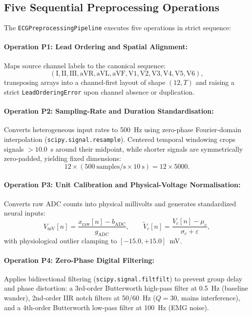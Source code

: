 \documentclass{ssnreview}
\begin{document}
\subsection{Five Sequential Preprocessing Operations}

The \texttt{ECGPreprocessingPipeline} executes five operations in strict sequence:

\paragraph{Operation P1: Lead Ordering and Spatial Alignment:} Maps source channel labels to the
canonical sequence:
\begin{equation}
  (\mathrm{I},\mathrm{II},\mathrm{III},\mathrm{aVR},\mathrm{aVL},
  \mathrm{aVF},\mathrm{V1},\mathrm{V2},\mathrm{V3},\mathrm{V4},
  \mathrm{V5},\mathrm{V6}),
\end{equation}
transposing arrays into a channel-first layout of shape $(12, T)$ and raising a strict
\texttt{LeadOrderingError} upon channel absence or duplication.

\paragraph{Operation P2: Sampling-Rate and Duration Standardisation:} Converts heterogeneous
input rates to 500~Hz using zero-phase Fourier-domain interpolation
(\texttt{scipy.signal.resample}). Centered temporal windowing crops signals $>10.0$~s around
their midpoint, while shorter signals are symmetrically zero-padded, yielding fixed dimensions:
\begin{equation}
  12\times(500\ \mathrm{samples/s}\times10\ \mathrm{s}) = 12\times5000.
\end{equation}

\paragraph{Operation P3: Unit Calibration and Physical-Voltage Normalisation:} Converts raw ADC
counts into physical millivolts and generates standardized neural inputs:
\begin{equation}
  V_{\mathrm{mV}}[n] = \frac{x_{\mathrm{raw}}[n]-b_{\mathrm{ADC}}}{g_{\mathrm{ADC}}}, \qquad
  \widetilde{V}_{c}[n] = \frac{V_c[n]-\mu_c}{\sigma_c+\varepsilon},
  \label{eq:adc-calibration}
\end{equation}
with physiological outlier clamping to $[-15.0, +15.0]$~mV.

\paragraph{Operation P4: Zero-Phase Digital Filtering:} Applies bidirectional filtering
(\texttt{scipy.signal.filtfilt}) to prevent group delay and phase distortion: a 3rd-order
Butterworth high-pass filter at 0.5~Hz (baseline wander), 2nd-order IIR notch filters at
50/60~Hz ($Q=30$, mains interference), and a 4th-order Butterworth low-pass filter at 100~Hz
(EMG noise).
\end{document}
